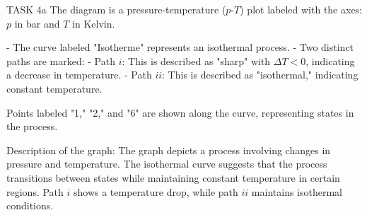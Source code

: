 TASK 4a  
The diagram is a pressure-temperature (\( p \)-\( T \)) plot labeled with the axes: \( p \) in bar and \( T \) in Kelvin.  

- The curve labeled "Isotherme" represents an isothermal process.  
- Two distinct paths are marked:  
  - Path \( i \): This is described as "sharp" with \( \Delta T < 0 \), indicating a decrease in temperature.  
  - Path \( ii \): This is described as "isothermal," indicating constant temperature.  

Points labeled "1," "2," and "6" are shown along the curve, representing states in the process.  

Description of the graph:  
The graph depicts a process involving changes in pressure and temperature. The isothermal curve suggests that the process transitions between states while maintaining constant temperature in certain regions. Path \( i \) shows a temperature drop, while path \( ii \) maintains isothermal conditions.